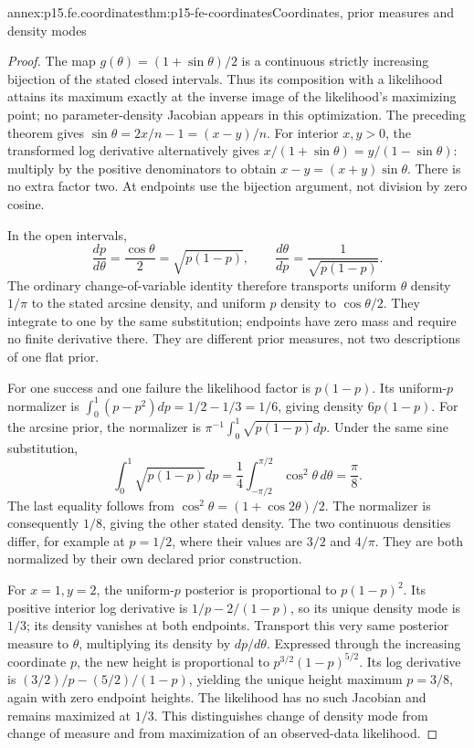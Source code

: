 \begin{annexitem}{annex:p15.fe.coordinates}{thm:p15-fe-coordinates}{Coordinates, prior measures and density modes}
\begin{proof}
The map \(g(\theta)=(1+\sin\theta)/2\) is a continuous strictly
increasing bijection of the stated closed intervals. Thus its composition
with a likelihood attains its maximum exactly at the inverse image of
the likelihood's maximizing point; no parameter-density Jacobian appears
in this optimization. The preceding theorem gives
\(\sin\widehat\theta=2x/n-1=(x-y)/n\).
For interior \(x,y>0\), the transformed log derivative alternatively
gives
\(x/(1+\sin\theta)=y/(1-\sin\theta)\): multiply by the
positive denominators to obtain
\(x-y=(x+y)\sin\theta\). There is no extra factor two.
At endpoints use the bijection argument, not division by zero cosine.

In the open intervals,
\[
 \frac{dp}{d\theta}=\frac{\cos\theta}{2}
                    =\sqrt{p(1-p)},\qquad
 \frac{d\theta}{dp}=\frac1{\sqrt{p(1-p)}}.
\]
The ordinary change-of-variable identity therefore transports uniform
\(\theta\) density \(1/\pi\) to the stated arcsine density, and
uniform \(p\) density to \(\cos\theta/2\).
They integrate to one by the same substitution; endpoints have zero
mass and require no finite derivative there. They are different prior
measures, not two descriptions of one flat prior.

For one success and one failure the likelihood factor is \(p(1-p)\).
Its uniform-\(p\) normalizer is
\(\int_0^1(p-p^2)dp=1/2-1/3=1/6\), giving density \(6p(1-p)\).
For the arcsine prior, the normalizer is
\(\pi^{-1}\int_0^1\sqrt{p(1-p)}dp\).
Under the same sine substitution,
\[
 \int_0^1\sqrt{p(1-p)}dp
    =\frac14\int_{-\pi/2}^{\pi/2}\cos^2\theta\,d\theta
    =\frac\pi8.
\]
The last equality follows from
\(\cos^2\theta=(1+\cos2\theta)/2\).
The normalizer is consequently \(1/8\), giving the other stated density.
The two continuous densities differ, for example at \(p=1/2\),
where their values are \(3/2\) and \(4/\pi\).
They are both normalized by their own declared prior construction.

For \(x=1,y=2\), the uniform-\(p\) posterior is proportional
to \(p(1-p)^2\). Its positive interior log derivative is
\(1/p-2/(1-p)\), so its unique density mode is \(1/3\);
its density vanishes at both endpoints. Transport this very same
posterior measure to \(\theta\), multiplying its density by
\(dp/d\theta\). Expressed through the increasing coordinate \(p\),
the new height is proportional to \(p^{3/2}(1-p)^{5/2}\).
Its log derivative is \((3/2)/p-(5/2)/(1-p)\), yielding the
unique height maximum \(p=3/8\), again with zero endpoint heights.
The likelihood has no such Jacobian and remains maximized at \(1/3\).
This distinguishes change of density mode from change of measure and
from maximization of an observed-data likelihood.
\end{proof}
\end{annexitem}

